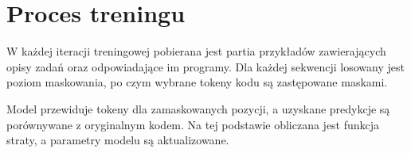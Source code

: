 
\section{Proces treningu}
\label{sec:trening}

W każdej iteracji treningowej pobierana jest partia przykładów zawierających opisy zadań oraz odpowiadające im programy. Dla każdej sekwencji losowany jest poziom maskowania, po czym wybrane tokeny kodu są zastępowane maskami.

Model przewiduje tokeny dla zamaskowanych pozycji, a uzyskane predykcje są porównywane z oryginalnym kodem. Na tej podstawie obliczana jest funkcja straty, a parametry modelu są aktualizowane.


